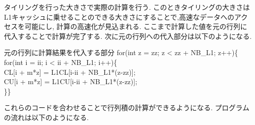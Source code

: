 \documentclass[11pt,a4paper]{jsreport}
\theoremstyle{definition}
\begin{document}
タイリングを行った大きさで実際の計算を行う. このときタイリングの大きさはL1キャッシュに乗せることのできる大きさにすることで,高速なデータへのアクセスを可能にし, 計算の高速化が見込まれる. ここまで計算した値を元の行列に代入することで計算が完了する. 次に元の行列への代入部分は以下のようになる.
\begin{itembox}[l]{元の行列に計算結果を代入する部分}
for(int z = zz; z < zz + NB\_L1; z++)\{ \\
                for(int i = ii; i < ii + NB\_L1; i++)\{ \\
                    CL[i + m*z] = L1CL[i-ii + NB\_L1*(z-zz)]; \\
                    CU[i + m*z] = L1CU[i-ii + NB\_L1*(z-zz)]; \\
                \}\}
\end{itembox}
これらのコードを合わせることで行列積の計算ができるようになる. プログラムの流れは以下のようになる.
\end{document}
